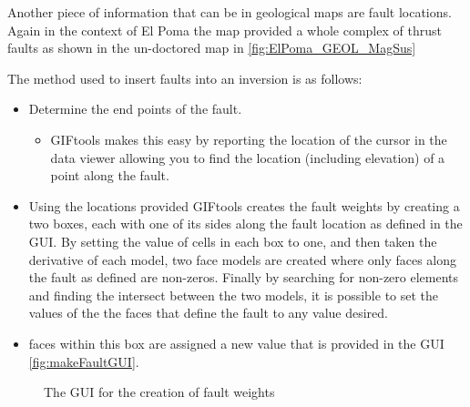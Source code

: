Another piece of information that can be in geological maps are fault locations. Again in the context of El Poma the map provided a whole complex of thrust faults as shown in the un-doctored map in \autoref{fig:ElPoma_GEOL_MagSus}

The method used to insert faults into an inversion is as follows:

\begin{itemize}
\item Determine the end points of the fault.
\begin{itemize}
	\item GIFtools makes this easy by reporting the location of the cursor in the data viewer allowing you to find the location (including elevation) of a point along the fault.
\end{itemize}
\item Using the locations provided GIFtools creates the fault weights by creating a two boxes, each with one of its sides along the fault location as defined in the \ac{GUI}. By setting the value of cells in each box to one, and then taken the derivative of each model, two face models are created where only faces along the fault as defined are non-zeros. Finally by searching for non-zero elements and finding the intersect between the two models, it is possible to set the values of the the faces that define the fault to any value desired.

\item faces within this box are assigned a new value that is provided in the GUI \autoref{fig:makeFaultGUI}.
\end{itemize}

\begin{figure} [h]
    \centering
    \caption{The GUI for the creation of fault weights}
    \label{fig:makeFaultGUI}
\end{figure}

